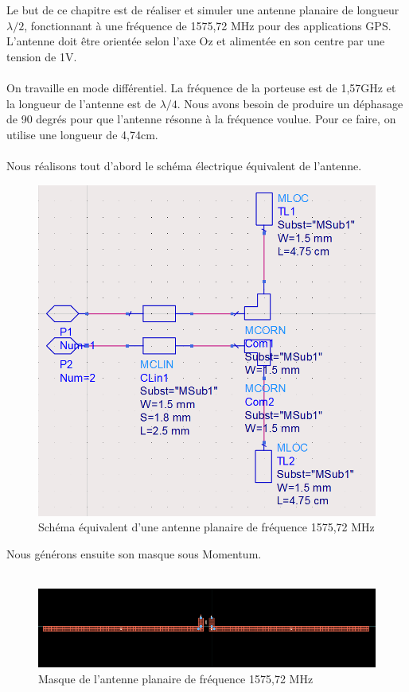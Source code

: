 \documentclass[16pt,a4paper,oneside,titlepage]{report}
\begin{document}
Le but de ce chapitre est de réaliser et simuler une antenne planaire de longueur $\lambda/2$, fonctionnant à une fréquence de 1575,72 MHz pour des applications GPS. L'antenne doit être orientée selon l'axe Oz et alimentée en son centre par une tension de 1V.\\\\
 
On travaille en mode différentiel. La fréquence de la porteuse est de 1,57GHz et la longueur de l'antenne est de $\lambda/4$.
Nous avons besoin de produire un déphasage de 90 degrés pour que l'antenne résonne à la fréquence voulue. Pour ce faire, on utilise une longueur de 4,74cm.\\\\
Nous réalisons tout d'abord le schéma électrique équivalent de l'antenne. 

\begin{figure}[h]
\center
\includegraphics[scale=0.3]{Images/P1_Q1.png}
\caption{Schéma équivalent d'une antenne planaire de fréquence 1575,72 MHz}
\end{figure}

Nous générons ensuite son masque sous Momentum.\\\\

\begin{figure}[h]
\center
\includegraphics[scale=0.6]{Images/P1_Q2-1.png}
\caption{Masque de l'antenne planaire de fréquence 1575,72 MHz}
\end{figure}
\end{document}
